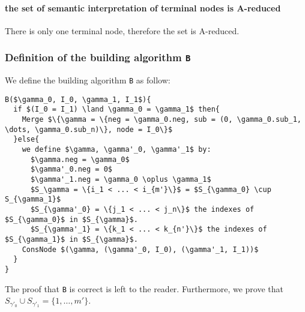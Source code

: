 \documentclass[a4paper,10pt]{article}
\begin{document}
\paragraph{the set of semantic interpretation of terminal nodes is A-reduced\\}
There is only one terminal node, therefore the set is A-reduced.

\subsubsection{Definition of the building algorithm \texttt{B}}
We define the building algorithm \texttt{B} as follow:
\begin{lstlisting}
B($\gamma_0, I_0, \gamma_1, I_1$){
  if $(I_0 = I_1) \land \gamma_0 = \gamma_1$ then{
    Merge $\{\gamma = \{neg = \gamma_0.neg, sub = (0, \gamma_0.sub_1, \dots, \gamma_0.sub_n)\}, node = I_0\}$
  }else{
    we define $\gamma, \gamma'_0, \gamma'_1$ by:
      $\gamma.neg = \gamma_0$
      $\gamma'_0.neg = 0$
      $\gamma'_1.neg = \gamma_0 \oplus \gamma_1$
      $S_\gamma = \{i_1 < ... < i_{m'}\}$ = $S_{\gamma_0} \cup S_{\gamma_1}$
      $S_{\gamma'_0} = \{j_1 < ... < j_n\}$ the indexes of $S_{\gamma_0}$ in $S_{\gamma}$.
      $S_{\gamma'_1} = \{k_1 < ... < k_{n'}\}$ the indexes of $S_{\gamma_1}$ in $S_{\gamma}$.
    ConsNode $(\gamma, (\gamma'_0, I_0), (\gamma'_1, I_1))$
  }
}  
\end{lstlisting}
The proof that \texttt{B} is correct is left to the reader.
Furthermore, we prove that $S_{\gamma'_0}\cup S_{\gamma'_1} = \{1, \dots, m'\}$.
\end{document}
